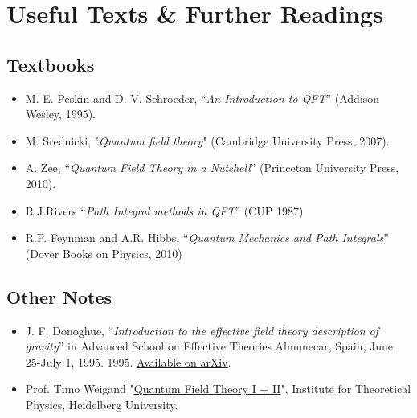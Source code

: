 \chapter*{Useful Texts \& Further Readings}

\section*{Textbooks}
\begin{itemize}
    \item M. E. Peskin and D. V. Schroeder, “\textit{An Introduction to QFT}” (Addison Wesley, 1995).
    \item M. Srednicki, "\textit{Quantum field theory}" (Cambridge University Press, 2007).
    \item A. Zee, “\textit{Quantum Field Theory in a Nutshell}” (Princeton University Press, 2010).
    \item R.J.Rivers “\textit{Path Integral methods in QFT}” (CUP 1987)
    \item R.P. Feynman and A.R. Hibbs, “\textit{Quantum Mechanics and Path Integrals}” (Dover Books on Physics, 2010)
\end{itemize}

\section*{Other Notes}
\begin{itemize}
    \item J. F. Donoghue, “\textit{Introduction to the effective field theory description of gravity}” in Advanced School on Effective Theories Almunecar, Spain, June 25-July 1, 1995. 1995. \href{https://arxiv.org/pdf/gr-qc/9512024.pdf}{Available on arXiv}.
    \item Prof. Timo Weigand "\href{https://www.thphys.uni-heidelberg.de/~weigand/QFT2-14/SkriptQFT2.pdf}{Quantum Field Theory I + II}", Institute for Theoretical Physics, Heidelberg University. 
\end{itemize}
